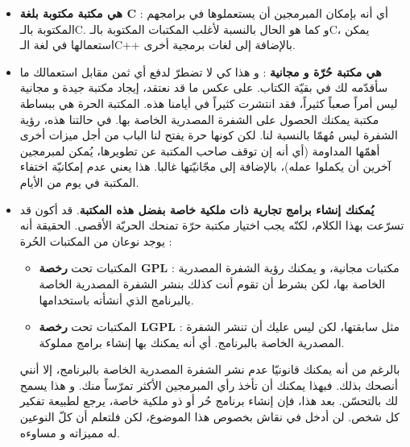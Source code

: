 \begin{itemize}
	\item \textbf{هي مكتبة مكتوبة بلغة
	\textenglish{C}} :
	 أي أنه بإمكان المبرمجين أن يستعملوها في برامجهم المكتوبة بالـ\textenglish{C}.
	 و كما هو الحال بالنسبة لأغلب المكتبات المكتوبة بالـ\textenglish{C}،
	 يمكن استعمالها في لغة الـ\textenglish{C++}
	 بالإضافة إلى لغات برمجية أخرى.
	 \item \textbf{هي مكتبة حُرّة و مجانية} :
و هذا كي لا تضطرّ لدفع أي ثمن مقابل استعمالك ما سأقدّمه لك في بقيّة الكتاب. على عكس ما قد نعتقد، إيجاد مكتبة جيدة و مجانية ليس أمراً صعباً كثيراً، فقد انتشرت كثيراً في أيامنا هذه. المكتبة الحرة هي ببساطة مكتبة يمكنك الحصول على الشفرة المصدرية الخاصة بها. في حالتنا هذه، رؤية الشفرة ليس مُهمّا بالنسبة لنا. لكن كونها حرة يفتح لنا الباب من أجل ميزات أخرى أهمّها المداومة (أي أنه إن توقف صاحب المكتبة عن تطويرها، يُمكن لمبرمجين آخرين أن يكملوا عمله)، بالإضافة إلى مجّانيّتها غالبا. هذا يعني عدم إمكانيّة اختفاء المكتبة في يوم من الأيام.
	 \item \textbf{يُمكنك إنشاء برامج تجارية ذات ملكية خاصة بفضل هذه المكتبة}.
	 قد أكون قد تسرّعت بهذا الكلام، لكنّه يجب اختيار مكتبة حرّة تمنحك الحريّة الأقصى. الحقيقة أنه يوجد نوعان من المكتبات الحُرة :
	 
	 \begin{itemize}
	 	\item المكتبات تحت 
	 	\textbf{رخصة \textenglish{GPL}} :
	 	 مكتبات مجانية، و يمكنك رؤية الشفرة المصدرية الخاصة بها، لكن بشرط أن تقوم أنت كذلك بنشر الشفرة المصدرية الخاصة بالبرنامج الذي أنشأته باستخدامها.
	 	\item المكتبات تحت 
	 	\textbf{رخصة \textenglish{LGPL}} :
	 	مثل سابقتها، لكن ليس عليك أن تنشر الشفرة المصدرية الخاصة بالبرنامج. أي أنه يمكنك بها إنشاء برامج مملوكة.
	 \end{itemize}
 	
 	\begin{information}
بالرغم من أنه يمكنك قانونيّا عدم نشر الشفرة المصدرية الخاصة بالبرنامج، إلا أنني أنصحك بذلك. فبهذا يمكنك أن تأخذ رأي المبرمجين الأكثر تمرّساً منك. و هذا يسمح لك بالتحسّن. بعد هذا، فإن إنشاء برنامج حُر أو ذو ملكية خاصة، يرجع لطبيعة تفكير كل شخص. لن أدخل في نقاش بخصوص هذا الموضوع، لكن فلتعلم أن كلّ النوعين له مميزاته و مساوءه.
 	\end{information}


\end{itemize}
